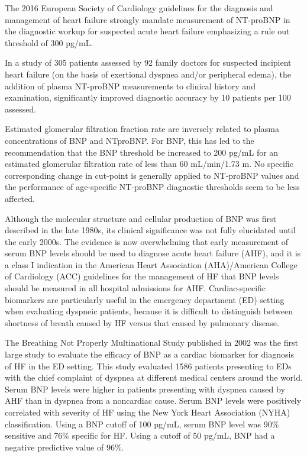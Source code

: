 \documentclass[14pt,a4paper,onecolumn]{extarticle}
\begin{document}
The 2016 European Society of Cardiology guidelines for the diagnosis and management of heart failure strongly mandate measurement of NT-proBNP in the diagnostic workup for suspected acute heart failure emphasizing a rule out threshold of 300 pg/mL. \citep{Ponikowski2016}

In a study of 305 patients assessed by 92 family doctors for suspected incipient heart failure (on the basis of exertional dyspnea and/or peripheral edema), the addition of plasma NT-proBNP measurements to clinical history and examination, significantly improved diagnostic accuracy by 10 patients per 100 assessed. \citep{bib3133}


Estimated glomerular filtration fraction rate are inversely related to plasma concentrations of BNP and NTproBNP. For BNP, this has led to the recommendation that the BNP threshold be increased to 200 pg/mL for an estimated glomerular filtration rate of less than 60 mL/min/1.73 m. No specific corresponding change in cut-point is generally applied to NT-proBNP values and the performance of age-specific NT-proBNP diagnostic thresholds seem to be less affected. \citep{DeFilippi2008}

Although the molecular structure and cellular production of BNP was first described in the late 1980s, its clinical significance was not fully elucidated until the early 2000s. The evidence is now overwhelming that early measurement of serum BNP levels should be used to diagnose acute heart failure (AHF), and it is a class I indication in the American Heart Association (AHA)/American College of Cardiology (ACC) guidelines for the management of HF that BNP levels should be measured in all hospital admissions for AHF. Cardiac-specific biomarkers are particularly useful in the emergency department (ED) setting when evaluating dyspneic patients, because it is difficult to distinguish between shortness of breath caused by HF versus that caused by pulmonary disease. \citep{Maisel2018}

The Breathing Not Properly Multinational Study published in 2002 was the first large study to evaluate the efficacy of BNP as a cardiac biomarker for diagnosis of HF in the ED setting. This study evaluated 1586 patients presenting to EDs with the chief complaint of dyspnea at different medical centers around the world. Serum BNP levels were higher in patients presenting with dyspnea caused by AHF than in dyspnea from a noncardiac cause. Serum BNP levels were positively correlated with severity of HF using the New York Heart Association (NYHA) classification. Using a BNP cutoff of 100 pg/mL, serum BNP level was 90\% sensitive and 76\% specific for HF. Using a cutoff of 50 pg/mL, BNP had a negative predictive value of 96\%. \citep{Maisel2002} %
\end{document}
